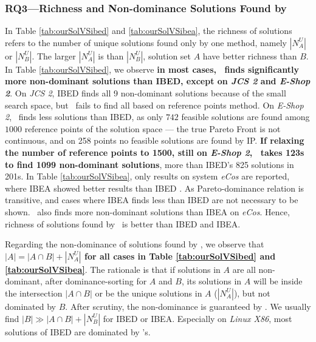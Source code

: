 \subsubsection{RQ3---Richness and Non-dominance  Solutions Found by \ourSol}\label{sec:results:rq3}
In Table \ref{tab:ourSolVSibed} and \ref{tab:ourSolVSibea}, the richness of solutions refers to the number of unique solutions found only by one method, namely $|N^U_A|$  or $|N^U_B|$. The larger $|N^U_A|$ is than $|N^U_B|$, solution set $A$ have better richness than $B$. In  Table \ref{tab:ourSolVSibed},  we observe \textbf{in most cases, \ourSol~finds significantly more non-dominant solutions than IBED, except on \emph{JCS 2} and \emph{E-Shop 2}}. On  \emph{JCS 2}, IBED finds all 9 non-dominant solutions because of the small search space, but \ourSol~fails to find all based on reference points method. On  \emph{E-Shop 2}, \ourSol~finds less solutions than IBED, as only $742$ feasible solutions are found among $1000$ reference points of the solution space --- the true Pareto Front is not continuous, and on 258 points no feasible solutions  are found by IP. \textbf{If relaxing the number of reference points to 1500, still on  \emph{E-Shop 2}, \ourSol~takes 123s to find 1099 non-dominant solutions}, more than IBED's 825 solutions in 201s. In Table \ref{tab:ourSolVSibea}, only results on system \emph{eCos} are reported, where IBEA showed better results than IBED \cite{DBLP:journals/asc/XueZT0CC016}. As Pareto-dominance relation is transitive, and cases where IBEA finds less than IBED are not necessary to be shown. \ourSol~also finds more non-dominant solutions than IBEA on \emph{eCos}. Hence, richness of solutions found by \ourSol~is better than IBED and IBEA.

Regarding the non-dominance of solutions found by \ourSol, we observe that \textbf{$|A|= |A\cap B| + |N^U_A|$   for all cases in Table \ref{tab:ourSolVSibed} and \ref{tab:ourSolVSibea}}. The rationale is that if solutions in $A$ are all non-dominant, after dominance-sorting for $A$ and $B$, its solutions in $A$ will be inside the intersection $|A\cap B|$ or be the unique solutions in $A$ ($|N^U_A|$), but not dominated by $B$. After scrutiny, the non-dominance is guaranteed by \ourSol. We usually find  $|B| \gg |A\cap B| + |N^U_B|$ for IBED or IBEA. Especially on \emph{Linux X86}, most solutions of IBED are dominated by \ourSol's.


